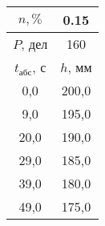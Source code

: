 \begin{tabular}[t]{|c|c|}
\hline
$n, \%$ & 0.15 \\
\hline
$P$, дел & 160 \\
\hline
$t_{абс}$, с & $h$, мм \\ 
\hline
0,0 & 200,0 \\ 
9,0 & 195,0 \\ 
20,0 & 190,0 \\ 
29,0 & 185,0 \\ 
39,0 & 180,0 \\ 
49,0 & 175,0 \\ 
\hline
\end{tabular}